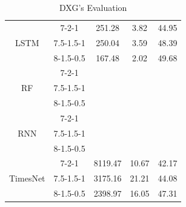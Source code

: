 \documentclass{ieeeojies}
\begin{document}
\begin{table}[H]
\begin{tabular}{|ccccc|}
  \multicolumn{1}{|c|}{\multirow{3}{*}{LSTM}}              & \multicolumn{1}{c|}{7-2-1}            & \multicolumn{1}{c|}{251.28}  & \multicolumn{1}{c|}{3.82}      & 44.95 \\ \cline{2-5} 
  \multicolumn{1}{|c|}{}                                   & \multicolumn{1}{c|}{7.5-1.5-1}        & \multicolumn{1}{c|}{250.04}  & \multicolumn{1}{c|}{3.59}      & 48.39 \\ \cline{2-5} 
  \multicolumn{1}{|c|}{}                                   & \multicolumn{1}{c|}{8-1.5-0.5}        & \multicolumn{1}{c|}{167.48}  & \multicolumn{1}{c|}{2.02}      & 49.68 \\ \hline
  \multicolumn{1}{|c|}{\multirow{3}{*}{RF}}                & \multicolumn{1}{c|}{7-2-1}            & \multicolumn{1}{c|}{}        & \multicolumn{1}{c|}{}          &       \\ \cline{2-5} 
  \multicolumn{1}{|c|}{}                                   & \multicolumn{1}{c|}{7.5-1.5-1}        & \multicolumn{1}{c|}{}        & \multicolumn{1}{c|}{}          &       \\ \cline{2-5} 
  \multicolumn{1}{|c|}{}                                   & \multicolumn{1}{c|}{8-1.5-0.5}        & \multicolumn{1}{c|}{}        & \multicolumn{1}{c|}{}          &       \\ \hline
  \multicolumn{1}{|c|}{\multirow{3}{*}{RNN}}               & \multicolumn{1}{c|}{7-2-1}            & \multicolumn{1}{c|}{}        & \multicolumn{1}{c|}{}          &       \\ \cline{2-5} 
  \multicolumn{1}{|c|}{}                                   & \multicolumn{1}{c|}{7.5-1.5-1}        & \multicolumn{1}{c|}{}        & \multicolumn{1}{c|}{}          &       \\ \cline{2-5} 
  \multicolumn{1}{|c|}{}                                   & \multicolumn{1}{c|}{8-1.5-0.5}        & \multicolumn{1}{c|}{}        & \multicolumn{1}{c|}{}          &       \\ \hline
  \multicolumn{1}{|c|}{\multirow{3}{*}{TimesNet}}          & \multicolumn{1}{c|}{7-2-1}            & \multicolumn{1}{c|}{8119.47} & \multicolumn{1}{c|}{10.67}     & 42.17 \\ \cline{2-5} 
  \multicolumn{1}{|c|}{}                                   & \multicolumn{1}{c|}{7.5-1.5-1}        & \multicolumn{1}{c|}{3175.16} & \multicolumn{1}{c|}{21.21}     & 44.08 \\ \cline{2-5} 
  \multicolumn{1}{|c|}{}                                   & \multicolumn{1}{c|}{8-1.5-0.5}        & \multicolumn{1}{c|}{2398.97} & \multicolumn{1}{c|}{16.05}     & 47.31 \\ \hline
  \end{tabular}
  \caption{DXG's Evaluation}
    \label{vcbresult}
  \end{table}
\end{document}
